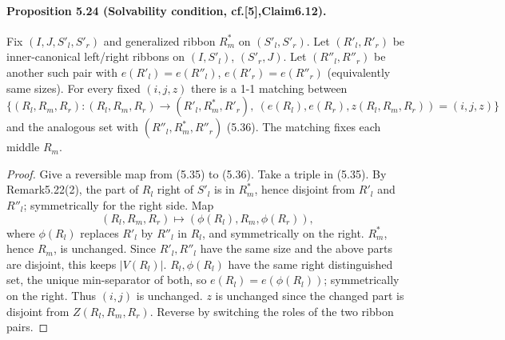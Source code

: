 \documentclass[10pt,a4paper]{article}
\begin{document}
\paragraph{Proposition 5.24 (Solvability condition, cf.[5],Claim6.12).} Fix $(I,J,S'_l,S'_r)$ and generalized ribbon $R^*_m$ on $(S'_l,S'_r)$. Let $(R'_l,R'_r)$ be inner-canonical left/right ribbons on $(I,S'_l)$, $(S'_r,J)$. Let $(R''_l,R''_r)$ be another such pair with $e(R'_l)=e(R''_l)$, $e(R'_r)=e(R''_r)$ (equivalently same sizes). For every fixed $(i,j,z)$ there is a 1-1 matching between
\[\{(R_l,R_m,R_r): (R_l,R_m,R_r)\to(R'_l,R^*_m,R'_r),\ (e(R_l),e(R_r),z(R_l,R_m,R_r))=(i,j,z)\}\tag{5.35}\]
and the analogous set with $(R''_l,R^*_m,R''_r)$ (5.36). The matching fixes each middle $R_m$.
\begin{proof}Give a reversible map from (5.35) to (5.36). Take a triple in (5.35). By Remark5.22(2), the part of $R_l$ right of $S'_l$ is in $R^*_m$, hence disjoint from $R'_l$ and $R''_l$; symmetrically for the right side. Map
\[(R_l,R_m,R_r)\mapsto(\phi(R_l),R_m,\phi(R_r)),\]
where $\phi(R_l)$ replaces $R'_l$ by $R''_l$ in $R_l$, and symmetrically on the right. $R^*_m$, hence $R_m$, is unchanged. Since $R'_l,R''_l$ have the same size and the above parts are disjoint, this keeps $|V(R_l)|$. $R_l,\phi(R_l)$ have the same right distinguished set, the unique min-separator of both, so $e(R_l)=e(\phi(R_l))$; symmetrically on the right. Thus $(i,j)$ is unchanged. $z$ is unchanged since the changed part is disjoint from $Z(R_l,R_m,R_r)$. Reverse by switching the roles of the two ribbon pairs.\end{proof}
\end{document}
